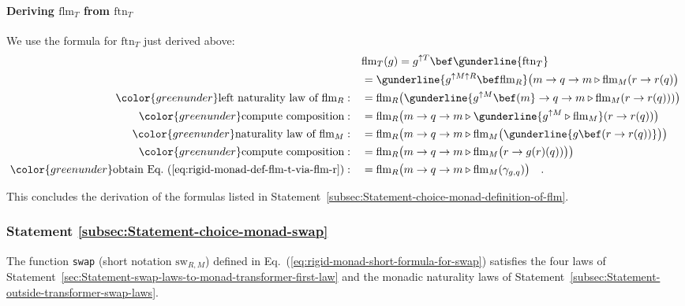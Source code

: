 \paragraph{Deriving $\text{flm}_{T}$ from $\text{ftn}_{T}$}

We use the formula for $\text{ftn}_{T}$ just derived above:
\begin{align*}
 & \text{flm}_{T}(g)=g^{\uparrow T}\bef\gunderline{\text{ftn}_{T}}\\
 & =\gunderline{g^{\uparrow M\uparrow R}\bef\text{flm}_{R}}\big(m\rightarrow q\rightarrow m\triangleright\text{flm}_{M}(r\rightarrow r(q)\big)\\
{\color{greenunder}\text{left naturality law of }\text{flm}_{R}:}\quad & =\text{flm}_{R}\big(\gunderline{g^{\uparrow M}\bef(m}\rightarrow q\rightarrow m\triangleright\text{flm}_{M}(r\rightarrow r(q)))\big)\\
{\color{greenunder}\text{compute composition}:}\quad & =\text{flm}_{R}\big(m\rightarrow q\rightarrow m\triangleright\gunderline{g^{\uparrow M}\triangleright\text{flm}_{M}}(r\rightarrow r(q))\big)\\
{\color{greenunder}\text{naturality law of }\text{flm}_{M}:}\quad & =\text{flm}_{R}\big(m\rightarrow q\rightarrow m\triangleright\text{flm}_{M}\big(\gunderline{g\bef(r\rightarrow r(q))}\big)\big)\\
{\color{greenunder}\text{compute composition}:}\quad & =\text{flm}_{R}\big(m\rightarrow q\rightarrow m\triangleright\text{flm}_{M}\big(r\rightarrow g(r)(q))\big)\big)\\
{\color{greenunder}\text{obtain Eq.~(\ref{eq:rigid-monad-def-flm-t-via-flm-r})}:}\quad & =\text{flm}_{R}\big(m\rightarrow q\rightarrow m\triangleright\text{flm}_{M}(\gamma_{g,q})\big)\quad.
\end{align*}

This concludes the derivation of the formulas listed in Statement~\ref{subsec:Statement-choice-monad-definition-of-flm}.

\subsubsection{Statement \label{subsec:Statement-choice-monad-swap}\ref{subsec:Statement-choice-monad-swap}}

The function \lstinline!swap! (short notation $\text{sw}_{R,M}$)
defined in Eq.~(\ref{eq:rigid-monad-short-formula-for-swap}) satisfies
the four laws of Statement~\ref{sec:Statement-swap-laws-to-monad-transformer-first-law}
and the monadic naturality laws of Statement~\ref{subsec:Statement-outside-transformer-swap-laws}.

